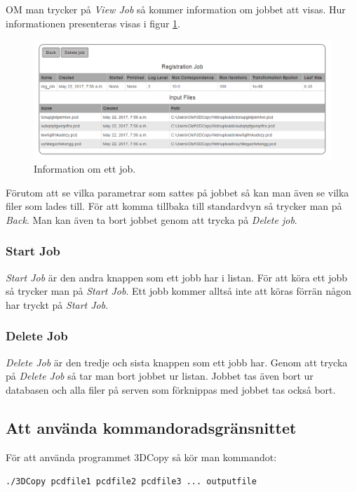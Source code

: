 \documentclass[a4paper,titlepage,12pt]{article}
\begin{document}
	OM man trycker på \textit{View Job} så kommer information om jobbet att visas. Hur informationen presenteras visas i figur \ref{fig:view_job}.
	
	\begin{figure}[H]
		\centering
		\includegraphics[width=160mm]{images/view_job.PNG}
		\caption{Information om ett job.}
		\label{fig:view_job}
	\end{figure}

	Förutom att se vilka parametrar som sattes på jobbet så kan man även se vilka filer som lades till. För att komma tillbaka till standardvyn så trycker man på \textit{Back}. Man kan även ta bort jobbet genom att trycka på \textit{Delete job}.
	
	\subsubsection{Start Job}
	
	\textit{Start Job} är den andra knappen som ett jobb har i listan. För att köra ett jobb så trycker man på \textit{Start Job}. Ett jobb kommer alltså inte att köras förrän någon har tryckt på \textit{Start Job}.
	
	\subsubsection{Delete Job}
	
	\textit{Delete Job} är den tredje och sista knappen som ett jobb har. Genom att trycka på \textit{Delete Job} så tar man bort jobbet ur listan. Jobbet tas även bort ur databasen och alla filer på serven som förknippas med jobbet tas också bort.
	
	\subsection{Att använda kommandoradsgränsnittet}
		För att använda programmet 3DCopy så kör man kommandot:
		
		\texttt{./3DCopy pcdfile1 pcdfile2 pcdfile3 ... outputfile}
		
\end{document}
